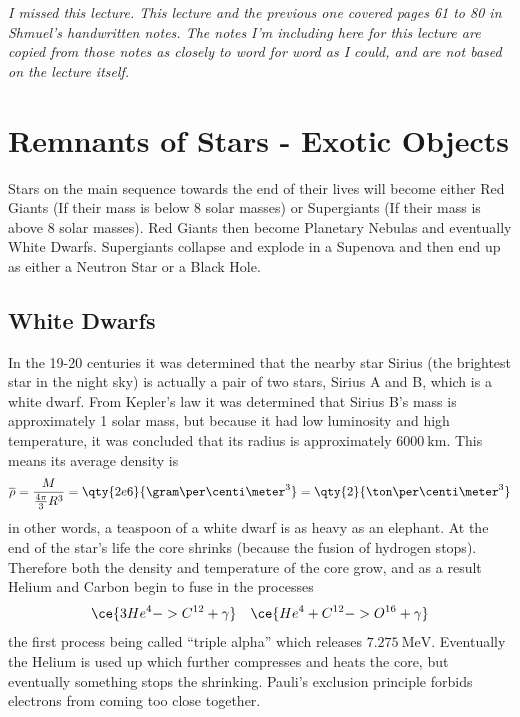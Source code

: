 \emph{I missed this lecture. This lecture and the previous one covered pages 61 to 80 in Shmuel's handwritten notes. The notes I'm including here for this lecture are copied from those notes as closely to word for word as I could, and are not based on the lecture itself.}
\section{Remnants of Stars - Exotic Objects}
Stars on the main sequence towards the end of their lives will become either Red Giants (If their mass is below 8 solar masses) or Supergiants (If their mass is above 8 solar masses). Red Giants then become Planetary Nebulas and eventually White Dwarfs. Supergiants collapse and explode in a Supenova and then end up as either a Neutron Star or a Black Hole.
\subsection{White Dwarfs}
In the 19-20 centuries it was determined that the nearby star Sirius (the brightest star in the night sky) is actually a pair of two stars, Sirius A and B, which is a white dwarf. From Kepler's law it was determined that Sirius B's mass is approximately 1 solar mass, but because it had low luminosity and high temperature, it was concluded that its radius is approximately \(\qty{6000}{\kilo\meter}\). This means its average density is
\begin{equation}
    \overline{\rho} = \frac{M}{\frac{4\pi}{3}R^3} = \qty{2e6}{\gram\per\centi\meter^3}=\qty{2}{\ton\per\centi\meter^3}
\end{equation}
in other words, a teaspoon of a white dwarf is as heavy as an elephant. At the end of the star's life the core shrinks (because the fusion of hydrogen stops). Therefore both the density and temperature of the core grow, and as a result Helium and Carbon begin to fuse in the processes
\begin{align}
    \ce{3He^4 -> C^{12} + \gamma} && \ce{He^4 + C^{12} -> O^{16} + \gamma}
\end{align}
the first process being called ``triple alpha'' which releases \(\qty{7.275}{\mega\electronvolt}\). Eventually the Helium is used up which further compresses and heats the core, but eventually something stops the shrinking. Pauli's exclusion principle forbids electrons from coming too close together.
